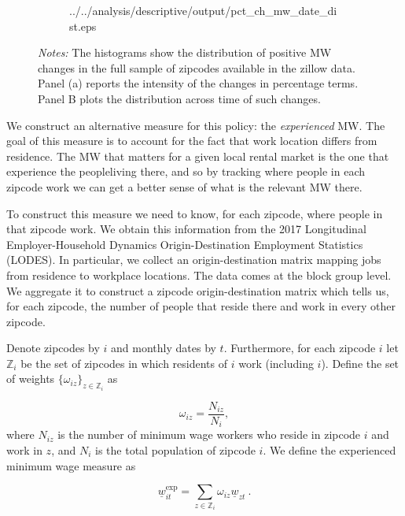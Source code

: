 \begin{figure}[h!]
\begin{subfigure}{.49\textwidth}
			{../../analysis/descriptive/output/pct_ch_mw_date_dist.eps}
	\end{subfigure}
	\begin{minipage}{\textwidth} \footnotesize
		\textit{Notes:} The histograms show the distribution of positive MW changes 
		in the full sample of zipcodes available in the zillow data. Panel (a) reports 
		the intensity of the changes in percentage terms. Panel B plots the distribution 
		across time of such changes. 
	\end{minipage}
\end{figure}

We construct an alternative measure for this policy: the \textit{experienced} MW. 
The goal of this measure is to account for the fact that work location differs from 
residence. The MW that matters for a given local rental market is the one that 
experience the peopleliving there, and so by tracking where people in each zipcode 
work we can get a better sense of what is the relevant MW there.

To construct this measure we need to know, for each zipcode, where people in that 
zipcode work. We obtain this information from the 2017 Longitudinal Employer-Household 
Dynamics Origin-Destination Employment Statistics (LODES). In particular, we collect an 
origin-destination matrix mapping jobs from residence to workplace locations. The data 
comes at the block group level. We aggregate it to construct a zipcode origin-destination
matrix which tells us, for each zipcode, the number of people that reside there and work 
in every other zipcode. 

Denote zipcodes by $i$ and monthly dates by $t$. Furthermore, for each zipcode $i$ let 
$\mathds{Z}_i$ be the set of zipcodes in which residents of $i$ work (including $i$). 
Define the set of weights $\{\omega_{iz}\}_{z \in \mathds{Z}_i}$ as 

\begin{equation*} \label{eq:weights}
	\omega_{iz} = \frac{N_{iz}}{N_i} ,
\end{equation*}
where $N_{iz}$ is the number of minimum wage workers who reside in zipcode $i$ and work 
in $z$, and $N_i$ is the total population of zipcode $i$. We define the experienced 
minimum wage measure as

\begin{equation}
	\underline{w}^{\text{exp}}_{it} = \sum_{z \in \mathds{Z}_i} \omega_{iz} \underline{w}_{zt} \ . 
\end{equation}

